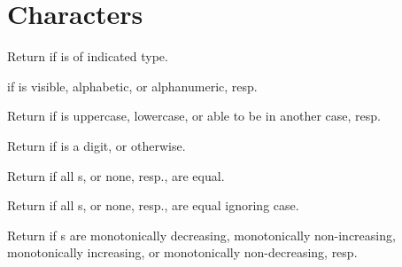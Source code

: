 %
%

\section{Characters} 

\begin{LIST}{1cm}

  {
  Return \retval{\T} if  is of indicated type.
  }

  {
  \retval{\T} if  is visible, alphabetic, or
  alphanumeric, resp.
  }

  {
  Return \retval{\T} if  is uppercase, lowercase, or
  able to be in another case, resp.
  }

  {
  Return  if  is a digit, or
  \retval{\NIL} otherwise.
  }

  {
  Return \retval{\T} if all s, or
  none, resp.,  are equal.
  }

  {
  Return \retval{\T} if all s, or
  none, resp.,  are equal ignoring case.
  }

  {
  Return \retval{\T} if s are
  monotonically decreasing, monotonically non-increasing, monotonically
  increasing, or monotonically non-decreasing, resp.
  }


\end{LIST}
